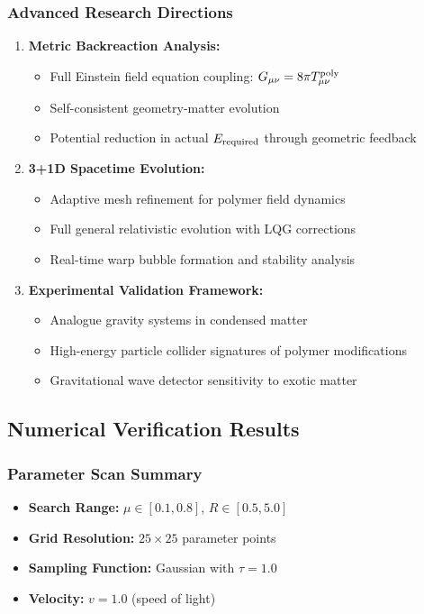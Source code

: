 \documentclass[11pt]{article}
\begin{document}
\subsubsection*{Advanced Research Directions}
\begin{enumerate}
  \item \textbf{Metric Backreaction Analysis:}
        \begin{itemize}
          \item Full Einstein field equation coupling: $G_{\mu\nu} = 8\pi T_{\mu\nu}^{\rm poly}$
          \item Self-consistent geometry-matter evolution
          \item Potential reduction in actual $E_{\rm required}$ through geometric feedback
        \end{itemize}

  \item \textbf{3+1D Spacetime Evolution:}
        \begin{itemize}
          \item Adaptive mesh refinement for polymer field dynamics
          \item Full general relativistic evolution with LQG corrections
          \item Real-time warp bubble formation and stability analysis
        \end{itemize}

  \item \textbf{Experimental Validation Framework:}
        \begin{itemize}
          \item Analogue gravity systems in condensed matter
          \item High-energy particle collider signatures of polymer modifications
          \item Gravitational wave detector sensitivity to exotic matter
        \end{itemize}
\end{enumerate}

\subsection*{Numerical Verification Results}

\subsubsection*{Parameter Scan Summary}
\begin{itemize}
  \item \textbf{Search Range:} $\mu \in [0.1, 0.8]$, $R \in [0.5, 5.0]$
  \item \textbf{Grid Resolution:} $25 \times 25$ parameter points
  \item \textbf{Sampling Function:} Gaussian with $\tau = 1.0$
  \item \textbf{Velocity:} $v = 1.0$ (speed of light)
\end{itemize}
\end{document}
